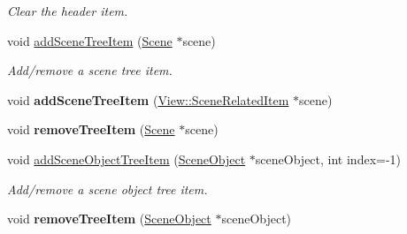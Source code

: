 \begin{Indent}
\begin{DoxyCompactItemize}
\begin{DoxyCompactList}\small\item\em Clear the header item. \end{DoxyCompactList}\item 
\mbox{\label{classrev_1_1_view_1_1_scene_tree_widget_af06f8970e9b94c301daa134f3ebc73f4}} 
void \mbox{\hyperlink{classrev_1_1_view_1_1_scene_tree_widget_af06f8970e9b94c301daa134f3ebc73f4}{add\+Scene\+Tree\+Item}} (\mbox{\hyperlink{classrev_1_1_scene}{Scene}} $\ast$scene)
\begin{DoxyCompactList}\small\item\em Add/remove a scene tree item. \end{DoxyCompactList}\item 
\mbox{\label{classrev_1_1_view_1_1_scene_tree_widget_a190aeb7f5ff71470360b8d6b744f4b88}} 
void {\bfseries add\+Scene\+Tree\+Item} (\mbox{\hyperlink{classrev_1_1_view_1_1_scene_related_item}{View\+::\+Scene\+Related\+Item}} $\ast$scene)
\item 
\mbox{\label{classrev_1_1_view_1_1_scene_tree_widget_a7cab52cb0d64f90e1d45ebe098c8f8b7}} 
void {\bfseries remove\+Tree\+Item} (\mbox{\hyperlink{classrev_1_1_scene}{Scene}} $\ast$scene)
\item 
\mbox{\label{classrev_1_1_view_1_1_scene_tree_widget_af1ab90f77b35ebc5ea52849c9b719b6f}} 
void \mbox{\hyperlink{classrev_1_1_view_1_1_scene_tree_widget_af1ab90f77b35ebc5ea52849c9b719b6f}{add\+Scene\+Object\+Tree\+Item}} (\mbox{\hyperlink{classrev_1_1_scene_object}{Scene\+Object}} $\ast$scene\+Object, int index=-\/1)
\begin{DoxyCompactList}\small\item\em Add/remove a scene object tree item. \end{DoxyCompactList}\item 
\mbox{\label{classrev_1_1_view_1_1_scene_tree_widget_a8c16cd57562988516df98a72a6f04716}} 
void {\bfseries remove\+Tree\+Item} (\mbox{\hyperlink{classrev_1_1_scene_object}{Scene\+Object}} $\ast$scene\+Object)
\item 
\mbox{\label{classrev_1_1_view_1_1_scene_tree_widget_aebc54daf5ba8d29af13186d02272ad18}} 

\end{DoxyCompactItemize}
\end{Indent}
